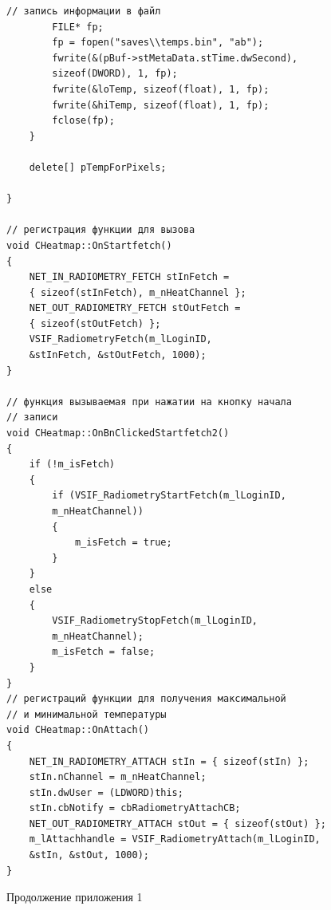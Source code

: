 \documentclass[14pt, a4paper]{extreport}
\begin{document}
\begin{Verbatim}[fontseries=c, fontsize=\fontsize{10pt}{12pt}\selectfont]
		// запись информации в файл
		FILE* fp;
		fp = fopen("saves\\temps.bin", "ab");
		fwrite(&(pBuf->stMetaData.stTime.dwSecond), 
		sizeof(DWORD), 1, fp);
		fwrite(&loTemp, sizeof(float), 1, fp);
		fwrite(&hiTemp, sizeof(float), 1, fp);
		fclose(fp);
	}
	
	delete[] pTempForPixels;
	
}

// регистрация функции для вызова
void CHeatmap::OnStartfetch()
{
	NET_IN_RADIOMETRY_FETCH stInFetch = 
	{ sizeof(stInFetch), m_nHeatChannel };
	NET_OUT_RADIOMETRY_FETCH stOutFetch = 
	{ sizeof(stOutFetch) };
	VSIF_RadiometryFetch(m_lLoginID, 
	&stInFetch, &stOutFetch, 1000);
}

// функция вызываемая при нажатии на кнопку начала 
// записи
void CHeatmap::OnBnClickedStartfetch2()
{
	if (!m_isFetch)
	{
		if (VSIF_RadiometryStartFetch(m_lLoginID, 
		m_nHeatChannel))
		{
			m_isFetch = true;
		}
	}
	else
	{
		VSIF_RadiometryStopFetch(m_lLoginID, 
		m_nHeatChannel);
		m_isFetch = false;
	}
}
// регистраций функции для получения максимальной
// и минимальной температуры
void CHeatmap::OnAttach()
{
	NET_IN_RADIOMETRY_ATTACH stIn = { sizeof(stIn) };
	stIn.nChannel = m_nHeatChannel;
	stIn.dwUser = (LDWORD)this;
	stIn.cbNotify = cbRadiometryAttachCB;
	NET_OUT_RADIOMETRY_ATTACH stOut = { sizeof(stOut) };
	m_lAttachhandle = VSIF_RadiometryAttach(m_lLoginID, 
	&stIn, &stOut, 1000);
}
\end{Verbatim}
\noindent Продолжение приложения 1
\end{document}
